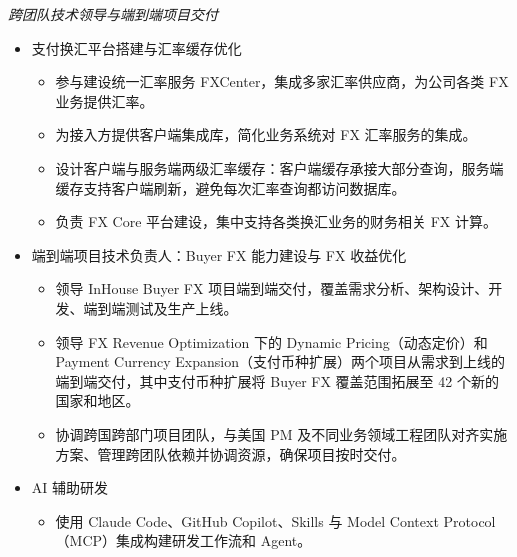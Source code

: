 \documentclass{resume}
\begin{document}
\textit{跨团队技术领导与端到端项目交付}
\begin{itemize}
  \item 支付换汇平台搭建与汇率缓存优化
  \begin{itemize}
    \item[。] 参与建设统一汇率服务 FXCenter，集成多家汇率供应商，为公司各类 FX 业务提供汇率。
    \item[。] 为接入方提供客户端集成库，简化业务系统对 FX 汇率服务的集成。
    \item[。] 设计客户端与服务端两级汇率缓存：客户端缓存承接大部分查询，服务端缓存支持客户端刷新，避免每次汇率查询都访问数据库。
    \item[。] 负责 FX Core 平台建设，集中支持各类换汇业务的财务相关 FX 计算。
  \end{itemize}
  \item 端到端项目技术负责人：Buyer FX 能力建设与 FX 收益优化
  \begin{itemize}
    \item[。] 领导 InHouse Buyer FX 项目端到端交付，覆盖需求分析、架构设计、开发、端到端测试及生产上线。
    \item[。] 领导 FX Revenue Optimization 下的 Dynamic Pricing（动态定价）和 Payment Currency Expansion（支付币种扩展）两个项目从需求到上线的端到端交付，其中支付币种扩展将 Buyer FX 覆盖范围拓展至 42 个新的国家和地区。
    \item[。] 协调跨国跨部门项目团队，与美国 PM 及不同业务领域工程团队对齐实施方案、管理跨团队依赖并协调资源，确保项目按时交付。
  \end{itemize}
  \item AI 辅助研发
  \begin{itemize}
    \item[。] 使用 Claude Code、GitHub Copilot、Skills 与 Model Context Protocol（MCP）集成构建研发工作流和 Agent。
  \end{itemize}
\end{itemize}
\end{document}
